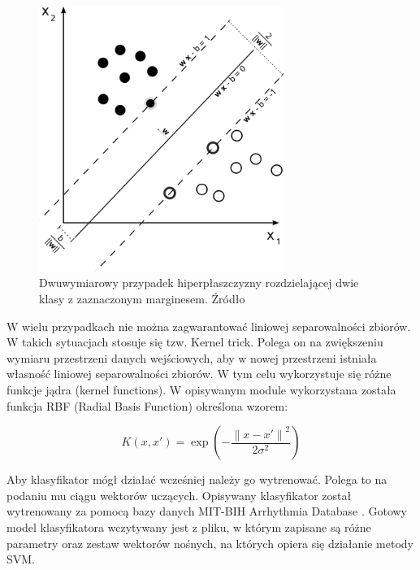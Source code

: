 \begin{figure}[h]
	\centering
	\includegraphics[width=8cm]{Grafika/Svm_max_sep_hyperplane_with_margin}
	\caption{Dwuwymiarowy przypadek hiperpłaszczyzny rozdzielającej dwie klasy z zaznaczonym marginesem. Źródło \cite{SVMWiki}}
	\label{fig:SVM}
\end{figure}

\qquad W wielu przypadkach nie można zagwarantować liniowej separowalności zbiorów.  W takich sytuacjach stosuje się tzw. Kernel trick. Polega on na zwiększeniu wymiaru przestrzeni danych wejściowych, aby w nowej przestrzeni istniała własność liniowej separowalności zbiorów. W tym celu wykorzystuje się różne funkcje jądra (kernel functions). W opisywanym module wykorzystana została funkcja RBF (Radial Basis Function) określona wzorem:

\begin{equation}
\label{eq:RBF}
K(x,x') = \exp{\left(-\frac{{\|x-x'\|}^{2}}{2\sigma^2}\right)}
\end{equation}

\qquad Aby klasyfikator mógł działać wcześniej należy go wytrenować. Polega to na podaniu mu ciągu wektorów uczących. Opisywany klasyfikator został wytrenowany za pomocą bazy danych MIT-BIH Arrhythmia Database \cite{MITDB}. Gotowy model klasyfikatora wczytywany jest z pliku, w którym zapisane są różne parametry oraz zestaw wektorów nośnych, na których opiera się działanie metody SVM.
